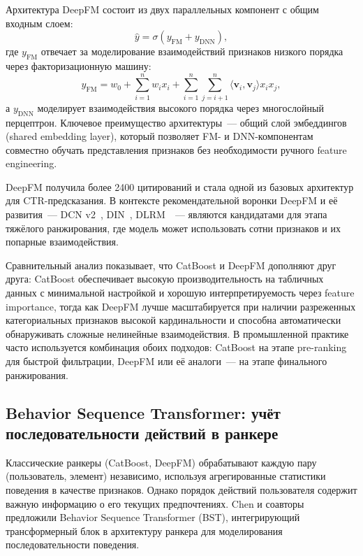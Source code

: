 Архитектура DeepFM состоит из двух параллельных компонент с общим входным слоем:
\begin{equation}
    \hat{y} = \sigma\!\left(y_{\mathrm{FM}} + y_{\mathrm{DNN}}\right),
\end{equation}
где $y_{\mathrm{FM}}$ отвечает за моделирование взаимодействий признаков низкого порядка через факторизационную машину:
\begin{equation}
    y_{\mathrm{FM}} = w_0 + \sum_{i=1}^{n} w_i x_i + \sum_{i=1}^{n}\sum_{j=i+1}^{n} \langle \mathbf{v}_i, \mathbf{v}_j \rangle x_i x_j,
\end{equation}
а $y_{\mathrm{DNN}}$ моделирует взаимодействия высокого порядка через многослойный перцептрон. Ключевое преимущество архитектуры~--- общий слой эмбеддингов (shared embedding layer), который позволяет FM- и DNN-компонентам совместно обучать представления признаков без необходимости ручного feature engineering.

DeepFM получила более 2400 цитирований и стала одной из базовых архитектур для CTR-предсказания. В контексте рекомендательной воронки DeepFM и её развития~--- DCN v2~\cite{wang2021dcnv2}, DIN~\cite{zhou2018din}, DLRM~\cite{naumov2019dlrm}~--- являются кандидатами для этапа тяжёлого ранжирования, где модель может использовать сотни признаков и их попарные взаимодействия.

Сравнительный анализ показывает, что CatBoost и DeepFM дополняют друг друга: CatBoost обеспечивает высокую производительность на табличных данных с минимальной настройкой и хорошую интерпретируемость через feature importance, тогда как DeepFM лучше масштабируется при наличии разреженных категориальных признаков высокой кардинальности и способна автоматически обнаруживать сложные нелинейные взаимодействия. В промышленной практике часто используется комбинация обоих подходов: CatBoost на этапе pre-ranking для быстрой фильтрации, DeepFM или её аналоги~--- на этапе финального ранжирования.

\subsection{Behavior Sequence Transformer: учёт последовательности действий в ранкере}

Классические ранкеры (CatBoost, DeepFM) обрабатывают каждую пару (пользователь, элемент) независимо, используя агрегированные статистики поведения в качестве признаков. Однако порядок действий пользователя содержит важную информацию о его текущих предпочтениях. Chen и соавторы~\cite{chen2019bst} предложили Behavior Sequence Transformer (BST), интегрирующий трансформерный блок в архитектуру ранкера для моделирования последовательности поведения.


